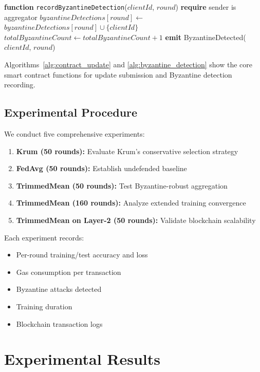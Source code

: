 \documentclass{ieeeaccess}
\begin{document}
\begin{algorithm}[t]
\caption{Byzantine Detection and Recording}
\label{alg:byzantine_detection}
\begin{algorithmic}[1]
\STATE \textbf{function} \texttt{recordByzantineDetection}($clientId$, $round$)
\STATE \textbf{require} sender is aggregator
\STATE $byzantineDetections[round] \gets$ $byzantineDetections[round] \cup \{clientId\}$
\STATE $totalByzantineCount \gets totalByzantineCount + 1$
\STATE \textbf{emit} ByzantineDetected($clientId$, $round$)
\end{algorithmic}
\end{algorithm}

Algorithms~\ref{alg:contract_update} and \ref{alg:byzantine_detection} show the core smart contract functions for update submission and Byzantine detection recording.

\subsection{Experimental Procedure}

We conduct five comprehensive experiments:

\begin{enumerate}
    \item \textbf{Krum (50 rounds):} Evaluate Krum's conservative selection strategy
    \item \textbf{FedAvg (50 rounds):} Establish undefended baseline
    \item \textbf{TrimmedMean (50 rounds):} Test Byzantine-robust aggregation
    \item \textbf{TrimmedMean (160 rounds):} Analyze extended training convergence
    \item \textbf{TrimmedMean on Layer-2 (50 rounds):} Validate blockchain scalability
\end{enumerate}

Each experiment records:
\begin{itemize}
    \item Per-round training/test accuracy and loss
    \item Gas consumption per transaction
    \item Byzantine attacks detected
    \item Training duration
    \item Blockchain transaction logs
\end{itemize}

\section{Experimental Results}
\label{sec:results}
\end{document}
